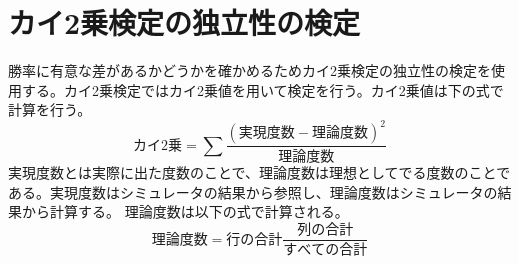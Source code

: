 \section{カイ2乗検定の独立性の検定}
勝率に有意な差があるかどうかを確かめるためカイ2乗検定の独立性の検定を使用する。カイ2乗検定ではカイ2乗値を用いて検定を行う。カイ2乗値は下の式で計算を行う。
\begin{equation} カイ2乗 = \sum{ \frac{(実現度数 - 理論度数)^2}{理論度数}} \end{equation}
実現度数とは実際に出た度数のことで、理論度数は理想としてでる度数のことである。実現度数はシミュレータの結果から参照し、理論度数はシミュレータの結果から計算する。
理論度数は以下の式で計算される。
\begin{equation} 理論度数 =  行の合計 \frac{列の合計}{すべての合計} \end{equation}
